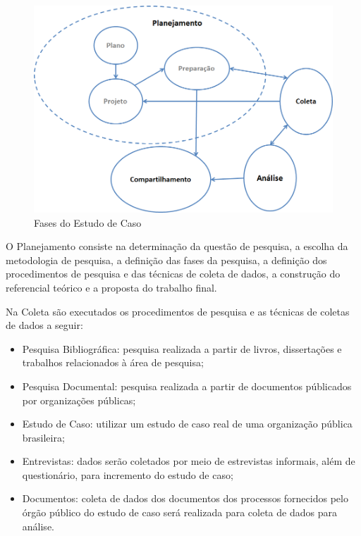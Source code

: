 	\begin{figure}[htb]
		\centering
		
			\includegraphics[scale=0.6]{figuras/fasesestudo.png}
		\caption{Fases do Estudo de Caso}
		\label{fases}
	\end{figure}

O Planejamento consiste na determinação da questão de pesquisa, a escolha da metodologia de pesquisa, a definição das fases da pesquisa,  a definição dos procedimentos de pesquisa e das técnicas de coleta de dados, a construção do referencial teórico e a proposta do trabalho final.


Na Coleta são executados os procedimentos de pesquisa e as técnicas de coletas de dados a seguir:

\begin{itemize}
\item Pesquisa Bibliográfica: pesquisa realizada a partir de livros, dissertações e trabalhos relacionados à área de pesquisa;
\item Pesquisa Documental: pesquisa realizada a partir de documentos públicados por organizações públicas;
\item Estudo de Caso: utilizar um estudo de caso real de uma organização pública brasileira;
\item Entrevistas: dados serão coletados por meio de estrevistas informais, além de questionário, para incremento do estudo de caso;
\item Documentos: coleta de dados dos documentos dos processos fornecidos pelo órgão público do estudo de caso será realizada para coleta de dados para análise.
\end{itemize}

